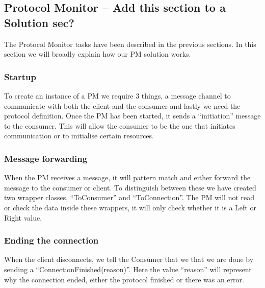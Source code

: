 \subsection{Protocol Monitor -- Add this section to a Solution sec?}
The Protocol Monitor tasks have been described in the previous sections. In this section we will broadly explain how our PM solution works.
\subsubsection{Startup}
To create an instance of a PM we require 3 things, a message channel to communicate with both the client and the consumer and lastly we need the protocol definition. Once the PM has been started, it sends a ``initiation'' message to the consumer. This will allow the consumer to be the one that initiates communication or to initialise certain resources.

\subsubsection{Message forwarding}
When the PM receives a message, it will pattern match and either forward the message to the consumer or client. To distinguish between these we have created two wrapper classes, ``ToConsumer'' and ``ToConnection''. The PM will not read or check the data inside these wrappers, it will only check whether it is a Left or Right value. 
\subsubsection{Ending the connection}
When the client disconnects, we tell the Consumer that we that we are done by sending a ``ConnectionFinished(reason)''. Here the value ``reason'' will represent why the connection ended, either the protocol finished or there was an error.

%
